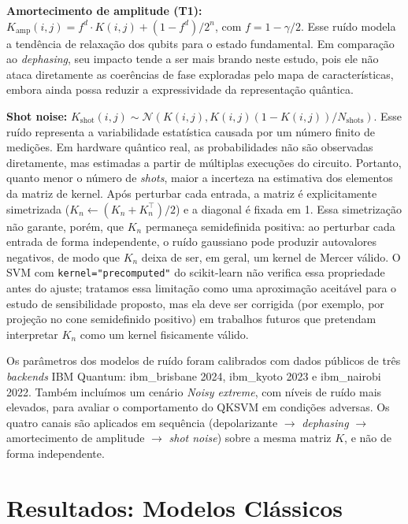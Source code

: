\documentclass[12pt]{article}
\begin{document}
\textbf{Amortecimento de amplitude (T1):} $K_\mathrm{amp}(i,j) = f^d \cdot K(i,j) + (1-f^d)/2^n$, com $f = 1-\gamma/2$. Esse ruído modela a tendência de relaxação dos qubits para o estado fundamental. Em comparação ao \textit{dephasing}, seu impacto tende a ser mais brando neste estudo, pois ele não ataca diretamente as coerências de fase exploradas pelo mapa de características, embora ainda possa reduzir a expressividade da representação quântica.

\textbf{Shot noise:} $K_\mathrm{shot}(i,j) \sim \mathcal{N}\left(K(i,j), K(i,j)(1-K(i,j))/N_\mathrm{shots}\right)$. Esse ruído representa a variabilidade estatística causada por um número finito de medições. Em hardware quântico real, as probabilidades não são observadas diretamente, mas estimadas a partir de múltiplas execuções do circuito. Portanto, quanto menor o número de \textit{shots}, maior a incerteza na estimativa dos elementos da matriz de kernel. Após perturbar cada entrada, a matriz é explicitamente simetrizada ($K_n \leftarrow (K_n + K_n^\top)/2$) e a diagonal é fixada em 1. Essa simetrização não garante, porém, que $K_n$ permaneça semidefinida positiva: ao perturbar cada entrada de forma independente, o ruído gaussiano pode produzir autovalores negativos, de modo que $K_n$ deixa de ser, em geral, um kernel de Mercer válido. O SVM com \texttt{kernel="precomputed"} do scikit-learn não verifica essa propriedade antes do ajuste; tratamos essa limitação como uma aproximação aceitável para o estudo de sensibilidade proposto, mas ela deve ser corrigida (por exemplo, por projeção no cone semidefinido positivo) em trabalhos futuros que pretendam interpretar $K_n$ como um kernel fisicamente válido.

Os parâmetros dos modelos de ruído foram calibrados com dados públicos de três \textit{backends} IBM Quantum: ibm\_brisbane 2024, ibm\_kyoto 2023 e ibm\_nairobi 2022. Também incluímos um cenário \textit{Noisy extreme}, com níveis de ruído mais elevados, para avaliar o comportamento do QKSVM em condições adversas. Os quatro canais são aplicados em sequência (depolarizante $\rightarrow$ \textit{dephasing} $\rightarrow$ amortecimento de amplitude $\rightarrow$ \textit{shot noise}) sobre a mesma matriz $K$, e não de forma independente.


\section{Resultados: Modelos Clássicos}
\label{sec:resultados_classico}
\end{document}

